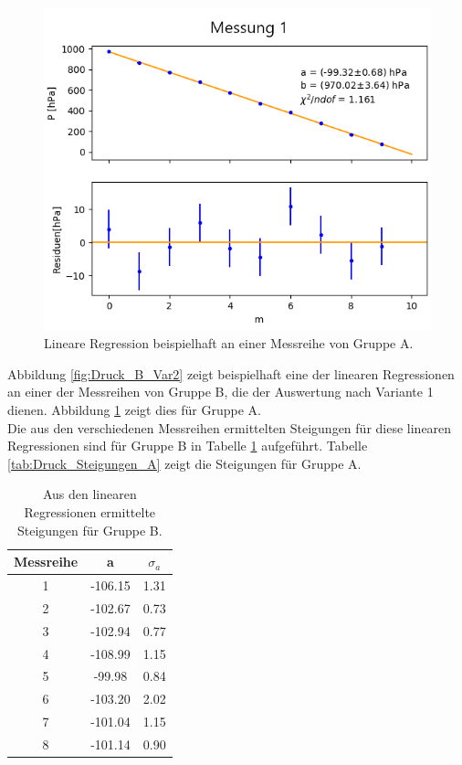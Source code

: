 \documentclass[12pt,a4paper]{article}
\begin{document}
\begin{figure}
\centering
\includegraphics[scale=0.8]{Bilder/Druck_A_Var2_1.png}
\caption{Lineare Regression beispielhaft an einer Messreihe von Gruppe A.}
\label{fig:Druck_A_Var2}
\end{figure}

Abbildung \ref{fig:Druck_B_Var2} zeigt beispielhaft eine der linearen Regressionen an einer der Messreihen von Gruppe B, die der Auswertung nach Variante 1 dienen. Abbildung \ref{fig:Druck_A_Var2} zeigt dies für Gruppe A. \\
Die aus den verschiedenen Messreihen ermittelten Steigungen für diese linearen Regressionen sind für Gruppe B in Tabelle \ref{tab:Druck_Steigungen_B} aufgeführt. Tabelle \ref{tab:Druck_Steigungen_A} zeigt die Steigungen für Gruppe A.

\begin{table}
\begin{center}
\begin{tabular}{|c|c|c|}
\hline 
Messreihe & a & $\sigma _a$ \\ 
\hline 
1 & -106.15 & 1.31 \\ 
\hline 
2 & -102.67 & 0.73 \\ 
\hline 
3 & -102.94 & 0.77 \\ 
\hline 
4 & -108.99 & 1.15 \\ 
\hline 
5 & -99.98 & 0.84 \\ 
\hline 
6 & -103.20 & 2.02 \\ 
\hline 
7 & -101.04 & 1.15 \\ 
\hline 
8 & -101.14 & 0.90 \\ 
\hline 
\end{tabular} 
\caption{Aus den linearen Regressionen ermittelte Steigungen für Gruppe B.}
\label{tab:Druck_Steigungen_B}
\end{center}
\end{table}
\end{document}
